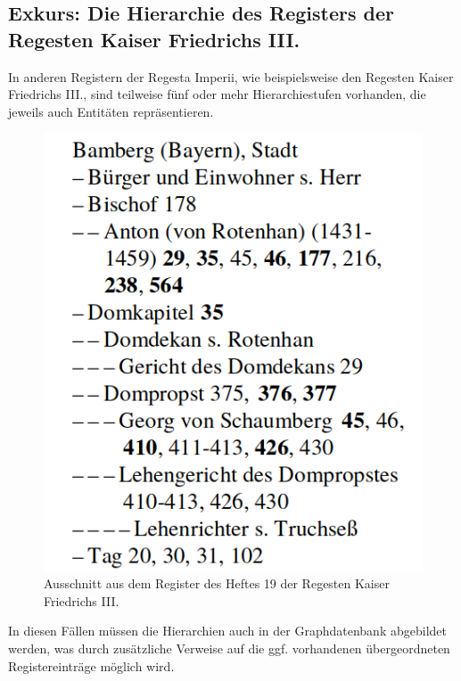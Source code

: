 \documentclass[ngerman,]{scrreprt}
\begin{document}
\subsection{Exkurs: Die Hierarchie des Registers der Regesten Kaiser Friedrichs III.}\label{exkurs-die-hierarchie-des-registers-der-regesten-kaiser-friedrichs-iii.}

In anderen Registern der Regesta Imperii, wie beispielsweise den Regesten Kaiser Friedrichs III., sind teilweise fünf oder mehr Hierarchiestufen vorhanden, die jeweils auch Entitäten repräsentieren.

\begin{figure}
\centering
\includegraphics{Bilder/RI2Graph/ReggF3-Registerhierarchie.png}
\caption{Ausschnitt aus dem Register des Heftes 19 der Regesten Kaiser Friedrichs III.}
\end{figure}

In diesen Fällen müssen die Hierarchien auch in der Graphdatenbank abgebildet werden, was durch zusätzliche Verweise auf die ggf. vorhandenen übergeordneten Registereinträge möglich wird.
\end{document}
